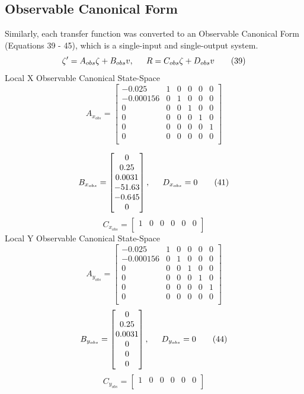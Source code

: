 \documentclass[conference]{IEEEtran}
\begin{document}
\subsection{Observable Canonical Form}
Similarly, each transfer function was converted to an Observable Canonical Form (Equations 39 - 45), which is a single-input and
single-output system. \\
\[
\zeta^\prime = A_{obs}\zeta + B_{obs}v, \indent R = C_{obs}\zeta + D_{obs}v
\tag{39}
\] 
Local X Observable Canonical State-Space\\
\[
A_{x_{obs}} = 
\begin{bmatrix}
-0.025&1& 0& 0& 0 &0\\
-0.000156 &0 &1 &0 &0 &0\\
0 &0 &0 &1 &0 &0\\
0 &0 &0& 0&1 &0\\
0 &0 &0 &0 &0&1\\
0 &0&0&0&0&0\\
\end{bmatrix}
\tag{40}
\]

\[
B_{x_{obs}} = 
\begin{bmatrix}
0\\
0.25\\
0.0031\\
-51.63\\
-0.645\\
0\\
\end{bmatrix},
\indent D_{x_{obs}} = 0
\tag{41}
\] 
\[
C_{x_{obs}} = 
\begin{bmatrix}
1&0&0&0&0&0\\
\end{bmatrix}
\tag{42}
\]
Local Y Observable Canonical State-Space\\
\[
A_{y_{obs}} = 
\begin{bmatrix}
-0.025&1& 0& 0& 0 &0\\
-0.000156 &0 &1 &0 &0 &0\\
0 &0 &0 &1 &0 &0\\
0 &0 &0& 0&1 &0\\
0 &0 &0 &0 &0&1\\
0 &0&0&0&0&0\\
\end{bmatrix}
\tag{43}
\]
\[
B_{y_{obs}} = 
\begin{bmatrix}
0\\
0.25\\
0.0031\\
0\\
0\\
0\\
\end{bmatrix},
\indent D_{y_{obs}} = 0
\tag{44}
\] 
\[
C_{y_{obs}} = 
\begin{bmatrix}
1&0&0&0&0&0\\
\end{bmatrix}
\tag{45}
\]
\end{document}
